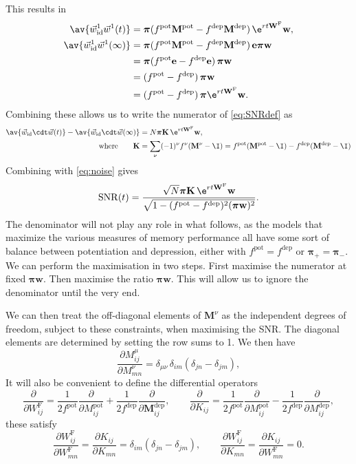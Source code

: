 \documentclass[12pt]{article}
\newcommand{\onev}{\mathbf{e}}
\newcommand{\eqm}{\pi}
\newcommand{\eq}{\boldsymbol{\eqm}}
\newcommand{\wm}{w}
\newcommand{\w}{\mathbf{\wm}}
\newcommand{\Wm}{W}
\newcommand{\W}{\mathbf{\Wm}}
\newcommand{\MMdm}{M}
\newcommand{\MMd}{\mathbf{\MMdm}}
\newcommand{\encm}{K}
\newcommand{\enc}{\mathbf{\encm}}
\newcommand{\frgm}{\Wm^{\mathrm{F}}}
\newcommand{\frg}{\W^{\mathrm{F}}}
\newcommand{\pot}{^{\text{pot}}}
\newcommand{\dep}{^{\text{dep}}}
\newcommand{\syn}{\vec{w}}
\newcommand{\synid}{\syn_\text{id}}
\DeclareMathOperator{\SNR}{SNR}
\renewcommand{\pdiff}[2]{\frac{\partial #1}{\partial #2}}
\begin{document}
This results in
%
\begin{equation}\label{eq:overlapwt}
\begin{aligned}
  \av{\synid^1 \syn^1(t)} &= \eq (f\pot \MMd \pot-f\dep \MMd \dep)\, \e^{rt\frg} \w, \\
  \av{\synid^1 \syn^1(\infty)} &= \eq (f\pot \MMd \pot-f\dep \MMd \dep)\, \onev\eq \w \\
         &= \eq (f\pot\onev-f\dep\onev)\, \eq \w \\
         &=  (f\pot-f\dep)\, \eq \w \\
         &=  (f\pot-f\dep)\, \eq \e^{rt\frg} \w .
\end{aligned}
\end{equation}
%
Combining these allows us to write the numerator of \eqref{eq:SNRdef} as
%
\begin{equation}\label{eq:signal}
\begin{aligned}
  \av{\synid \cdt \syn(t)} - \av{\synid \cdt \syn(\infty)}
    &= N \eq \enc \, \e^{rt \frg} \w , \\
    \text{where} \qquad
  \enc &= \sum_\nu (-1)^\nu f^\nu (\MMd^\nu - \I)
    = f\pot(\MMd \pot-\I)-f\dep(\MMd \dep-\I)
\end{aligned}
\end{equation}
%
Combining with \eqref{eq:noise} gives
%
\begin{equation}\label{eq:SNRcurveExact}
  \SNR(t) = \frac{\sqrt{N} \eq \enc\,\e^{rt \frg}\w}
                 {\sqrt{1-(f\pot-f\dep)^2(\eq \w)^2}}.
\end{equation}
%
The denominator will not play any role in what follows, as the models that maximize the various measures of memory performance all have some sort of balance between potentiation and depression, either with \(f\pot=f\dep\) or \(\eq_+=\eq_-\).
We can perform the maximisation in two steps.
First maximise the numerator at fixed \(\eq \w\).
Then maximise the ratio \wrt \(\eq\w\).
This will allow us to ignore the denominator until the very end.


We can then treat the off-diagonal elements of \(\MMd^\nu\) as the independent degrees of freedom, subject to these constraints, when maximising the SNR.
The diagonal elements are determined by setting the row sums to 1.
We then have
%
\begin{equation}\label{eq:derivpd}
  \pdiff{\MMdm^\mu_{ij}}{\MMdm^\nu_{mn}} 
      = \delta_{\mu\nu}\, \delta_{im}(\delta_{jn}-\delta_{jm}),
\end{equation}
%
It will also be convenient to define the differential operators
%
\begin{equation}\label{eq:pertfe}
  \pdiff{}{\frgm_{ij}} = \frac{1}{2f\pot} \pdiff{}{\MMdm \pot_{ij}} + \frac{1}{2f\dep} \pdiff{}{\MMd \dep_{ij}},
  \qquad
  \pdiff{}{\encm_{ij}} = \frac{1}{2f\pot} \pdiff{}{\MMdm \pot_{ij}} - \frac{1}{2f\dep} \pdiff{}{\MMdm \dep_{ij}},
\end{equation}
%
these satisfy
%
\begin{equation}\label{eq:derivfe}
  \pdiff{\frgm_{ij}}{\frgm_{mn}} = \pdiff{\encm_{ij}}{\encm_{mn}} = \delta_{im}(\delta_{jn}-\delta_{jm}),
  \qquad
  \pdiff{\frgm_{ij}}{\encm_{mn}} = \pdiff{\encm_{ij}}{\frgm_{mn}} = 0.
\end{equation}
%
\end{document}
